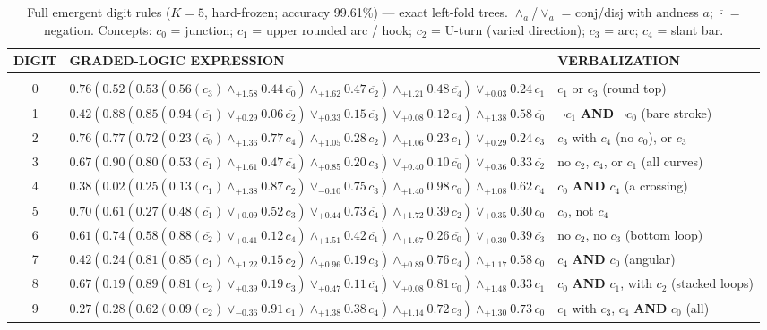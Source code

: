 \begin{table}[t]
\caption{Full emergent digit rules ($K{=}5$, hard-frozen; accuracy 99.61\%) --- exact left-fold trees. $\wedge_a$/$\vee_a$ = conj/disj with andness $a$; $\overline{\cdot}$ = negation. Concepts: $c_{0}$ = junction; $c_{1}$ = upper rounded arc / hook; $c_{2}$ = U-turn (varied direction); $c_{3}$ = arc; $c_{4}$ = slant bar.}
\label{tab:digit-rules-full}
\begin{center}\scriptsize
\begin{tabular}{c l l}
{\bf DIGIT} & {\bf GRADED-LOGIC EXPRESSION} & {\bf VERBALIZATION} \\ \hline \\
0 & $0.76(0.52(0.53(0.56(c_{3})\wedge_{+1.58}0.44\,\overline{c_{0}})\wedge_{+1.62}0.47\,\overline{c_{2}})\wedge_{+1.21}0.48\,\overline{c_{4}})\vee_{+0.03}0.24\,c_{1}$ & $c_1$ or $c_3$ (round top) \\[3pt]
1 & $0.42(0.88(0.85(0.94(\overline{c_{1}})\vee_{+0.29}0.06\,\overline{c_{2}})\vee_{+0.33}0.15\,\overline{c_{3}})\vee_{+0.08}0.12\,c_{4})\wedge_{+1.38}0.58\,\overline{c_{0}}$ & $\neg c_1$ \textbf{AND} $\neg c_0$ (bare stroke) \\[3pt]
2 & $0.76(0.77(0.72(0.23(\overline{c_{0}})\wedge_{+1.36}0.77\,c_{4})\wedge_{+1.05}0.28\,c_{2})\wedge_{+1.06}0.23\,c_{1})\vee_{+0.29}0.24\,c_{3}$ & $c_3$ with $c_4$ (no $c_0$), or $c_3$ \\[3pt]
3 & $0.67(0.90(0.80(0.53(\overline{c_{1}})\wedge_{+1.61}0.47\,\overline{c_{4}})\wedge_{+0.85}0.20\,c_{3})\vee_{+0.40}0.10\,\overline{c_{0}})\vee_{+0.36}0.33\,\overline{c_{2}}$ & no $c_2$, $c_4$, or $c_1$ (all curves) \\[3pt]
4 & $0.38(0.02(0.25(0.13(c_{1})\wedge_{+1.38}0.87\,c_{2})\vee_{-0.10}0.75\,c_{3})\wedge_{+1.40}0.98\,c_{0})\wedge_{+1.08}0.62\,c_{4}$ & $c_0$ \textbf{AND} $c_4$ (a crossing) \\[3pt]
5 & $0.70(0.61(0.27(0.48(\overline{c_{1}})\vee_{+0.09}0.52\,c_{3})\vee_{+0.44}0.73\,\overline{c_{4}})\wedge_{+1.72}0.39\,c_{2})\vee_{+0.35}0.30\,c_{0}$ & $c_0$, not $c_4$ \\[3pt]
6 & $0.61(0.74(0.58(0.88(\overline{c_{2}})\vee_{+0.41}0.12\,c_{4})\wedge_{+1.51}0.42\,\overline{c_{1}})\wedge_{+1.67}0.26\,\overline{c_{0}})\vee_{+0.30}0.39\,\overline{c_{3}}$ & no $c_2$, no $c_3$ (bottom loop) \\[3pt]
7 & $0.42(0.24(0.81(0.85(c_{1})\wedge_{+1.22}0.15\,c_{2})\wedge_{+0.96}0.19\,c_{3})\wedge_{+0.89}0.76\,c_{4})\wedge_{+1.17}0.58\,c_{0}$ & $c_4$ \textbf{AND} $c_0$ (angular) \\[3pt]
8 & $0.67(0.19(0.89(0.81(c_{2})\vee_{+0.39}0.19\,c_{3})\vee_{+0.47}0.11\,\overline{c_{4}})\vee_{+0.08}0.81\,c_{0})\wedge_{+1.48}0.33\,c_{1}$ & $c_0$ \textbf{AND} $c_1$, with $c_2$ (stacked loops) \\[3pt]
9 & $0.27(0.28(0.62(0.09(c_{2})\vee_{-0.36}0.91\,c_{1})\wedge_{+1.38}0.38\,c_{4})\wedge_{+1.14}0.72\,c_{3})\wedge_{+1.30}0.73\,c_{0}$ & $c_1$ with $c_3$, $c_4$ \textbf{AND} $c_0$ (all) \\[3pt]
\end{tabular}
\end{center}
\end{table}